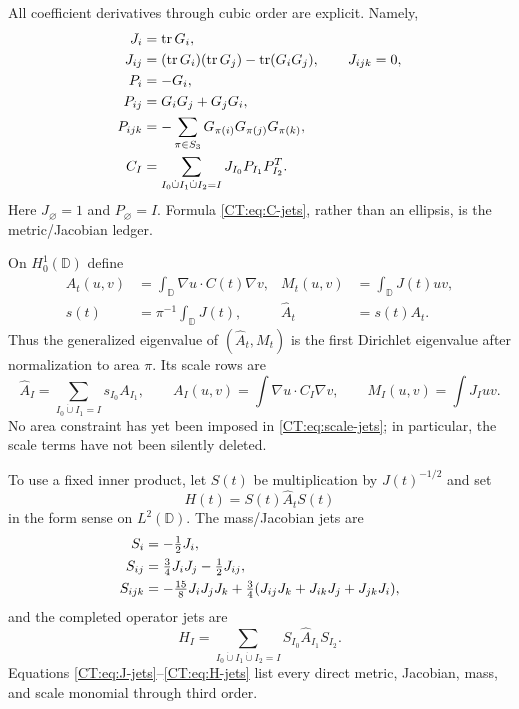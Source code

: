 \documentclass[11pt]{amsart}
\numberwithin{equation}{section}
\theoremstyle{definition}
\theoremstyle{remark}
\begin{document}
All coefficient derivatives through cubic order are explicit.  Namely,
\begin{align}
 J_i&=\operatorname {tr}G_i,\notag\\
 J_{ij}&=(\operatorname {tr}G_i)(\operatorname {tr}G_j)
          -\operatorname {tr}(G_iG_j),\qquad J_{ijk}=0,
 \label{CT:eq:J-jets}\\
 P_i&=-G_i,\notag\\
 P_{ij}&=G_iG_j+G_jG_i,\notag\\
 P_{ijk}&=-\sum_{\pi\in S_3}
 G_{\pi(i)}G_{\pi(j)}G_{\pi(k)},
 \label{CT:eq:P-jets}\\
 C_I&=\sum_{I_0\dot\cup I_1\dot\cup I_2=I}
 J_{I_0}P_{I_1}P_{I_2}^{T}.
 \label{CT:eq:C-jets}
\end{align}
Here $J_\varnothing=1$ and $P_\varnothing=I$.  Formula
\eqref{CT:eq:C-jets}, rather than an ellipsis, is the metric/Jacobian ledger.

On $H_0^1(\mathbb D)$ define
\begin{align}
 A_t(u,v)&=\int_{\mathbb D}\nabla u\cdot C(t)\nabla v,
 &M_t(u,v)&=\int_{\mathbb D}J(t)uv,\label{CT:eq:forms}\\
 s(t)&=\pi^{-1}\int_{\mathbb D}J(t),
 &\widehat A_t&=s(t)A_t.\label{CT:eq:scale-form}
\end{align}
Thus the generalized eigenvalue of $(\widehat A_t,M_t)$ is the first
Dirichlet eigenvalue after normalization to area $\pi$.  Its scale rows are
\begin{equation}\label{CT:eq:scale-jets}
 \widehat A_I
 =\sum_{I_0\dot\cup I_1=I}s_{I_0}A_{I_1},
 \qquad
 A_I(u,v)=\int\nabla u\cdot C_I\nabla v,
 \qquad M_I(u,v)=\int J_Iuv.
\end{equation}
No area constraint has yet been imposed in \eqref{CT:eq:scale-jets}; in
particular, the scale terms have not been silently deleted.

To use a fixed inner product, let $S(t)$ be multiplication by
$J(t)^{-1/2}$ and set
\begin{equation}\label{CT:eq:H}
 H(t)=S(t)\widehat A_tS(t)
\end{equation}
in the form sense on $L^2(\mathbb D)$.  The mass/Jacobian jets are
\begin{align}
 S_i&=-\tfrac12J_i,\notag\\
 S_{ij}&=\tfrac34J_iJ_j-\tfrac12J_{ij},\notag\\
 S_{ijk}&=-\tfrac{15}{8}J_iJ_jJ_k
 +\tfrac34(J_{ij}J_k+J_{ik}J_j+J_{jk}J_i),
 \label{CT:eq:S-jets}
\end{align}
and the completed operator jets are
\begin{equation}\label{CT:eq:H-jets}
 H_I=\sum_{I_0\dot\cup I_1\dot\cup I_2=I}
 S_{I_0}\widehat A_{I_1}S_{I_2}.
\end{equation}
Equations \eqref{CT:eq:J-jets}--\eqref{CT:eq:H-jets} list every direct metric,
Jacobian, mass, and scale monomial through third order.
\end{document}
